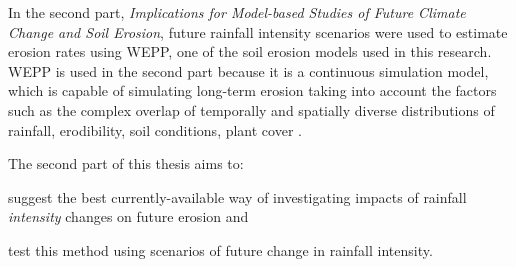 
In the second part, \textsl{Implications for Model-based Studies of Future
Climate Change and Soil Erosion}, future rainfall intensity scenarios
were used to estimate erosion rates using WEPP, one of the soil
erosion models used in this research. WEPP is used in the second part because it
is a continuous simulation model, which is capable of simulating long-term
erosion taking into account the factors such as the complex overlap of
temporally and spatially diverse distributions of rainfall, erodibility, soil
conditions, plant cover \citep{nearing2006-145}.

The second part of this thesis aims to:
\begin{itemize*}
  \item suggest the best currently-available way of investigating
impacts of rainfall
\textit{intensity} changes on future erosion and
  \item test this method using scenarios of future change in rainfall intensity.
\end{itemize*}

